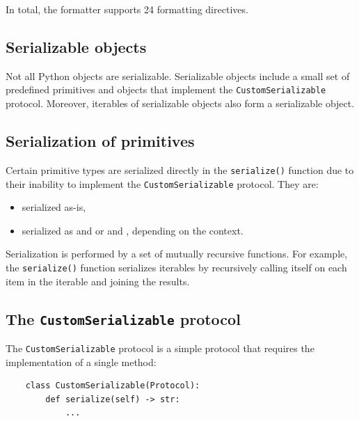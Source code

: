In total, the formatter supports 24 formatting directives.

\subsection{Serializable objects}

Not all Python objects are serializable. Serializable objects include a small set of predefined primitives and objects that implement the \texttt{CustomSerializable} protocol. Moreover, iterables of serializable objects also form a serializable object.

\subsection{Serialization of primitives}

Certain primitive types are serialized directly in the \texttt{serialize()} function due to their inability to implement the \texttt{CustomSerializable} protocol. They are:

\begin{itemize}
    \item {}\quad serialized as-is,
    \item {}\quad serialized as  and  or  and , depending on the context.
\end{itemize}

Serialization is performed by a set of mutually recursive functions. For example, the \texttt{serialize()} function serializes iterables by recursively calling itself on each item in the iterable and joining the results.

\subsection{The \texttt{CustomSerializable} protocol}

The \texttt{CustomSerializable} protocol is a simple protocol that requires the implementation of a single method:
\begin{verbatim}
    class CustomSerializable(Protocol):
        def serialize(self) -> str:
            ...
\end{verbatim}

